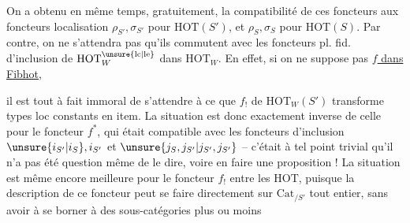 
On a obtenu en même temps, gratuitement, la compatibilité de ces foncteurs aux foncteurs localisation $\rho_{S'},\sigma_{S'}$  pour $\mathrm{HOT}(S')$, et $\rho_S,\sigma_S$ pour $\mathrm{HOT}(S)$. Par contre, on ne s'attendra pas qu'ils commutent avec les foncteurs pl. fid. d'inclusion de $\mathrm{HOT}^{\unsure{\mathrm{lc}|\mathrm{le}}}_W$ dans $\mathrm{HOT}_W$. En effet, si on ne suppose pas \uline{$f$ dans Fibhot},


il est tout à fait immoral de s'attendre à ce que $f_!$ de $\mathrm{HOT}_W(S')$ transforme types loc constants en item. La situation est donc exactement inverse de celle pour le foncteur $f^*$, qui était compatible avec les foncteurs d'inclusion $\unsure{i_{S'}|i_S},i_{S'}$ et $\unsure{j_S,j_{S'}|j_{S'},j_{S'}}$ -- c'était à tel point trivial qu'il n'a pas été question même de le dire, voire en faire une proposition ! La situation est même encore meilleure pour le foncteur $f_!$ entre les $\mathrm{HOT}$, puisque la description de ce foncteur peut se faire directement sur $\mathrm{Cat}_{/S'}$ tout entier, sans avoir à se borner à des sous-catégories plus ou moins
